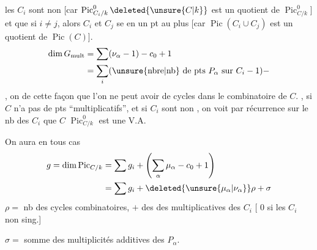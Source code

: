  les $C_i$ sont non  [car $\operatorname{Pic}^{0}_{C_i/k}\deleted{\unsure{C|k}}$ est un quotient de $\operatorname{Pic}^{0}_{C/k}$] et que   si $i\ne j$, alors $C_i$ et $C_j$ se  en un pt au plus [car $\operatorname{Pic}(C_i\cup C_j)$ est un quotient de $\operatorname{Pic}(C)$]. 
\[
\begin{aligned}
\dim G_{\mathrm{mult}}&=\sum(\nu_{\alpha}-1)-c_{0}+1\\
 &=\sum_{i}(\text{\unsure{nbre|nb} de pts }P_{\alpha}\text{ sur } C_i-1)-
\end{aligned}
\]
 , on  de cette façon que l'on ne peut avoir de cycles
dans le  combinatoire de $C$.  , si $C$ n'a pas de pts   ``multiplicatifs'', et si  $C_i$ sont non , on voit par récurrence sur le nb des $C_i$ que $C$  $\operatorname{Pic}^{0}_{C/k}$ est une V.A.

On aura en tous cas
\[
\begin{aligned}
g=\dim\operatorname{Pic}_{C/k}&=\sum g_i+\left(\sum_{\alpha}\mu_{\alpha}-c_{0}+1\right)\\
 &=\sum g_i+\deleted{\unsure{\mu_{\alpha}|\nu_{\alpha}}}\rho+\sigma
\end{aligned}
\]
$\rho=$ nb des cycles combinatoires, $+$  des  des  multiplicatives des $C_i$ [  $0$ si les $C_i$ non sing.]

$\sigma=$ somme des multiplicités additives des $P_{\alpha}$.
